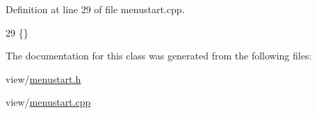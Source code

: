 Definition at line 29 of file menustart.\+cpp.


\begin{DoxyCode}
29 \{\}
\end{DoxyCode}


The documentation for this class was generated from the following files\+:\begin{DoxyCompactItemize}
\item 
view/\hyperlink{menustart_8h}{menustart.\+h}\item 
view/\hyperlink{menustart_8cpp}{menustart.\+cpp}\end{DoxyCompactItemize}
